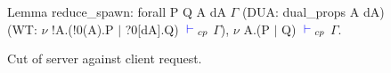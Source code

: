 \begin{figure}
\begin{coq}
Lemma reduce_spawn:
  forall P Q A dA $\Gamma$
         (DUA: dual_props A dA)
         (WT: $\nu$ !A.(!0(A).P $\mid$ ?0[dA].Q) ${\color{blue} {} \vdash {}}_{cp}$ $\Gamma$),
    $\nu$ A.(P $\mid$ Q) ${\color{blue} {} \vdash {}}_{cp}$ $\Gamma$.
\end{coq}
\caption{Cut of server against client request.}
\label{fig:principal}
\end{figure}
